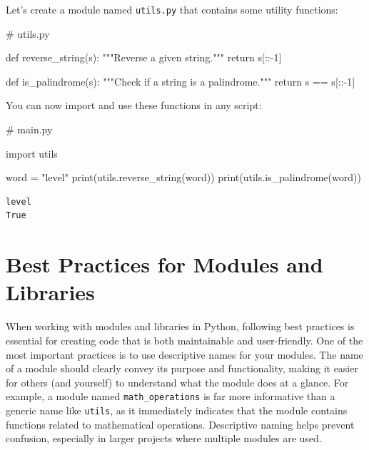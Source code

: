 \documentclass[
  letterpaper,
  DIV=11,
  numbers=noendperiod]{scrreprt}
\newenvironment{Shaded}{\begin{snugshade}}{\end{snugshade}}
\newcommand{\BuiltInTok}[1]{\textcolor[rgb]{0.00,0.23,0.31}{#1}}
\newcommand{\CommentTok}[1]{\textcolor[rgb]{0.37,0.37,0.37}{#1}}
\newcommand{\ControlFlowTok}[1]{\textcolor[rgb]{0.00,0.23,0.31}{#1}}
\newcommand{\DecValTok}[1]{\textcolor[rgb]{0.68,0.00,0.00}{#1}}
\newcommand{\ImportTok}[1]{\textcolor[rgb]{0.00,0.46,0.62}{#1}}
\newcommand{\KeywordTok}[1]{\textcolor[rgb]{0.00,0.23,0.31}{#1}}
\newcommand{\NormalTok}[1]{\textcolor[rgb]{0.00,0.23,0.31}{#1}}
\newcommand{\OperatorTok}[1]{\textcolor[rgb]{0.37,0.37,0.37}{#1}}
\newcommand{\StringTok}[1]{\textcolor[rgb]{0.13,0.47,0.30}{#1}}
\begin{document}
Let's create a module named \texttt{utils.py} that contains some utility
functions:

\begin{Shaded}
\begin{Highlighting}[]
\CommentTok{\# utils.py}

\KeywordTok{def}\NormalTok{ reverse\_string(s):}
    \CommentTok{"""Reverse a given string."""}
    \ControlFlowTok{return}\NormalTok{ s[::}\OperatorTok{{-}}\DecValTok{1}\NormalTok{]}

\KeywordTok{def}\NormalTok{ is\_palindrome(s):}
    \CommentTok{"""Check if a string is a palindrome."""}
    \ControlFlowTok{return}\NormalTok{ s }\OperatorTok{==}\NormalTok{ s[::}\OperatorTok{{-}}\DecValTok{1}\NormalTok{]}
\end{Highlighting}
\end{Shaded}

You can now import and use these functions in any script:

\begin{Shaded}
\begin{Highlighting}[]
\CommentTok{\# main.py}

\ImportTok{import}\NormalTok{ utils}

\NormalTok{word }\OperatorTok{=} \StringTok{"level"}
\BuiltInTok{print}\NormalTok{(utils.reverse\_string(word)) }
\BuiltInTok{print}\NormalTok{(utils.is\_palindrome(word))  }
\end{Highlighting}
\end{Shaded}

\begin{verbatim}
level
True
\end{verbatim}

\hypertarget{best-practices-for-modules-and-libraries}{%
\section{Best Practices for Modules and
Libraries}\label{best-practices-for-modules-and-libraries}}

When working with modules and libraries in Python, following best
practices is essential for creating code that is both maintainable and
user-friendly. One of the most important practices is to use descriptive
names for your modules. The name of a module should clearly convey its
purpose and functionality, making it easier for others (and yourself) to
understand what the module does at a glance. For example, a module named
\texttt{math\_operations} is far more informative than a generic name
like \texttt{utils}, as it immediately indicates that the module
contains functions related to mathematical operations. Descriptive
naming helps prevent confusion, especially in larger projects where
multiple modules are used.
\end{document}
